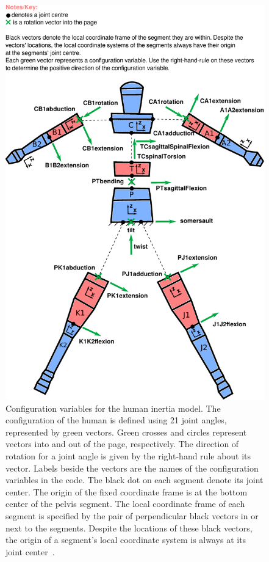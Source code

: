 \documentclass[10pt,a4paper,twocolumn]{article}
\begin{document}
\begin{figure}
  \begin{center}
    \includegraphics[width=1.6\columnwidth]{figures/configuration.pdf}
  \end{center}
  \caption{
    Configuration variables for the human inertia model. The configuration of
    the human is defined using 21 joint angles, represented by green vectors.
    Green crosses and circles represent vectors into and out of the page,
    respectively. The direction of rotation for a joint angle is given by the
    right-hand rule about its vector. Labels beside the vectors are the names
    of the configuration variables in the code. The black dot on each segment
    denote its joint center. The origin of the fixed coordinate frame is at the
    bottom center of the pelvis segment. The local coordinate frame of each
    segment is specified by the pair of perpendicular black vectors in or next
    to the segments. Despite the locations of these black vectors, the origin
    of a segment's local coordinate system is always at its joint
    center~\cite{Yeadon1990e}.
  }
  \label{fig:config}
\end{figure}
\end{document}
